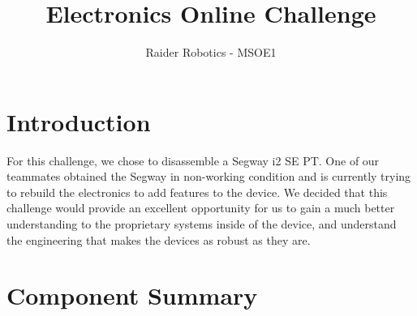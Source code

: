 \documentclass[]{formalLabReport}
\begin{document}
\title{Electronics Online Challenge}
\author{Raider Robotics - MSOE1}

\maketitle

\tableofcontents

\newpage

\section{Introduction}
For this challenge, we chose to disassemble a Segway i2 SE PT. One of our teammates obtained 
the Segway in non-working condition and is currently trying to rebuild the electronics to add
features to the device. We decided that this challenge would provide an excellent opportunity for
us to gain a much better understanding to the proprietary systems inside of the device, and understand
the engineering that makes the devices as robust as they are.

\section{Component Summary}
\end{document}
